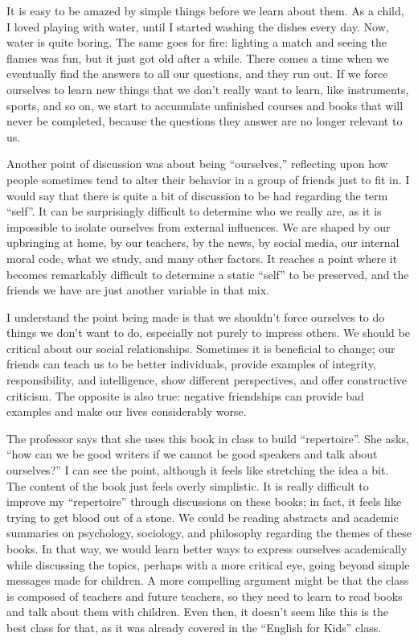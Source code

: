 It is easy to be amazed by simple things before we learn about them. As a child, I loved playing with water, until I started washing the dishes every day. Now, water is quite boring. The same goes for fire: lighting a match and seeing the flames was fun, but it just got old after a while. There comes a time when we eventually find the answers to all our questions, and they run out. If we force ourselves to learn new things that we don't really want to learn, like instruments, sports, and so on, we start to accumulate unfinished courses and books that will never be completed, because the questions they answer are no longer relevant to us.

Another point of discussion was about being ``ourselves,'' reflecting upon how people sometimes tend to alter their behavior in a group of friends just to fit in. I would say that there is quite a bit of discussion to be had regarding the term ``self''. It can be surprisingly difficult to determine who we really are, as it is impossible to isolate ourselves from external influences. We are shaped by our upbringing at home, by our teachers, by the news, by social media, our internal moral code, what we study, and many other factors. It reaches a point where it becomes remarkably difficult to determine a static ``self'' to be preserved, and the friends we have are just another variable in that mix.

I understand the point being made is that we shouldn't force ourselves to do things we don't want to do, especially not purely to impress others. We should be critical about our social relationships. Sometimes it is beneficial to change; our friends can teach us to be better individuals, provide examples of integrity, responsibility, and intelligence, show different perspectives, and offer constructive criticism. The opposite is also true: negative friendships can provide bad examples and make our lives considerably worse.

The professor says that she uses this book in class to build ``repertoire''. She asks, ``how can we be good writers if we cannot be good speakers and talk about ourselves?'' I can see the point, although it feels like stretching the idea a bit. The content of the book just feels overly simplistic. It is really difficult to improve my ``repertoire'' through discussions on these books; in fact, it feels like trying to get blood out of a stone. We could be reading abstracts and academic summaries on psychology, sociology, and philosophy regarding the themes of these books. In that way, we would learn better ways to express ourselves academically while discussing the topics, perhaps with a more critical eye, going beyond simple messages made for children. A more compelling argument might be that the class is composed of teachers and future teachers, so they need to learn to read books and talk about them with children. Even then, it doesn't seem like this is the best class for that, as it was already covered in the ``English for Kids'' class.

